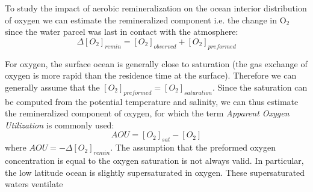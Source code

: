 \documentclass[article,12pt]{article}
\begin{document}


To study the impact of aerobic remineralization on the ocean interior distribution
of oxygen we can estimate the remineralized component i.e. the change in O$_2$
since the water parcel was last in contact with the atmosphere:
$$
\Delta[O_2]_{remin} = [O_2]_{observed} + [O_2]_{preformed}
$$

For oxygen, the surface ocean is generally close to saturation (the gas exchange of
oxygen is more rapid than the residence time at the surface). Therefore we can
generally assume that the $[O_2]_{preformed}=[O_2]_{saturation}$. Since the saturation
can be computed from the potential temperature and salinity, we can thus estimate
the remineralized component of oxygen, for which the term \textit{Apparent Oxygen
Utilization} is commonly used:
$$
AOU = [O_2]_{sat} - [O_2]
$$
 where $AOU = - \Delta[O_2]_{remin}$. The assumption that the preformed oxygen concentration
 is equal to the oxygen saturation is not always valid. In particular, the low latitude
 ocean is slightly supersaturated in oxygen. These supersaturated waters ventilate 







\end{document}
